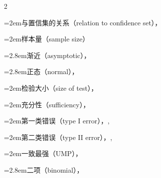 \begin{multicols}{2}
\par\noindent\hangindent=2em\hspace*{1em}\label{idx:507}与置信集的关系（relation to confidence set），\hyperref[thm:9.2.2]{\pageref*{thm:9.2.2}}\par
{}
\par\noindent\hangindent=2em\hspace*{1em}\label{idx:508}样本量（sample size）\par
\par\noindent\hangindent=2.8em\hspace*{1.8em}\label{idx:509}渐近（asymptotic），\hyperref[idxocc:509:427]{\pageref*{idxocc:509:427}}\par
\par\noindent\hangindent=2.8em\hspace*{1.8em}\label{idx:510}正态（normal），\hyperref[ex:8.3.4]{\pageref*{ex:8.3.4}}\par
\par\noindent\hangindent=2em\hspace*{1em}\label{idx:511}检验大小（size of test），\hyperref[def:8.3.5]{\pageref*{def:8.3.5}}\par
\par\noindent\hangindent=2em\hspace*{1em}\label{idx:512}充分性（sufficiency），\hyperref[cor:8.3.13]{\pageref*{cor:8.3.13}}\par
\par\noindent\hangindent=2em\hspace*{1em}\label{idx:513}第一类错误（type I error），\hyperref[tab:8.3.1]{\pageref*{tab:8.3.1}}, \hyperref[ex:8.3.4]{\pageref*{ex:8.3.4}}\par
\par\noindent\hangindent=2em\hspace*{1em}\label{idx:514}第二类错误（type II error），\hyperref[tab:8.3.1]{\pageref*{tab:8.3.1}}, \hyperref[ex:8.3.4]{\pageref*{ex:8.3.4}}\par
\par\noindent\hangindent=2em\hspace*{1em}\label{idx:515}一致最强（UMP），\hyperref[def:8.3.11]{\pageref*{def:8.3.11}}\par
\par\noindent\hangindent=2.8em\hspace*{1.8em}\label{idx:516}二项（binomial），\hyperref[ex:8.3.14]{\pageref*{ex:8.3.14}}\par

\end{multicols}
